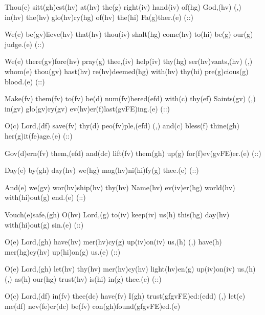 Thou(e) sitt(gh)est(hv) at(hv) the(g) right(iv) hand(iv) of(hg) God,(hv) (,) in(hv) the(hv) glo(hv)ry(hg) of(hv) the(hi) Fa(g)ther.(e) (::) 

We(e) be(gv)lieve(hv) that(hv) thou(iv) shalt(hg) come(hv) to(hi) be(g) our(g) judge.(e) (::)

We(e) there(gv)fore(hv) pray(g) thee,(iv) help(iv) thy(hg) ser(hv)vants,(hv) (,) whom(e) thou(gv) hast(hv) re(hv)deemed(hg) with(hv) thy(hi) pre(g)cious(g) blood.(e) (::)

Make(fv) them(fv) to(fv) be(d) num(fv)bered(efd) with(c) thy(ef) Saints(gv) (,) in(gv) glo(gv)ry(gv) ev(hv)er(f)last(gvFE)ing.(e) (::)

O(c) Lord,(df) save(fv) thy(d) peo(fv)ple,(efd) (,) and(c) bless(f) thine(gh) her(g)it(fe)age.(e) (::)

Gov(d)ern(fv) them,(efd) and(dc) lift(fv) them(gh) up(g) for(f)ev(gvFE)er.(e) (::)

Day(e) by(gh) day(hv) we(hg) mag(hv)ni(hi)fy(g) thee.(e) (::)

And(e) we(gv) wor(hv)ship(hv) thy(hv) Name(hv) ev(iv)er(hg) world(hv) with(hi)out(g) end.(e) (::)

Vouch(e)safe,(gh) O(hv) Lord,(g) to(iv) keep(iv) us(h) this(hg) day(hv) with(hi)out(g) sin.(e) (::)

O(e) Lord,(gh) have(hv) mer(hv)cy(g) up(iv)on(iv) us,(h) (,) have(h) mer(hg)cy(hv) up(hi)on(g) us.(e) (::)

O(e) Lord,(gh) let(hv) thy(hv) mer(hv)cy(hv) light(hv)en(g) up(iv)on(iv) us,(h) (,) as(h) our(hg) trust(hv) is(hi) in(g) thee.(e) (::)

O(c) Lord,(df) in(fv) thee(dc) have(fv) I(gh) trust(gfgvFE)ed:(edd) (,) let(c) me(df) nev(fe)er(dc) be(fv) con(gh)found(gfgvFE)ed.(e)

